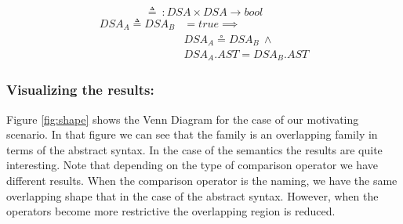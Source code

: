 \begin{itemize}
\begin{equation}
  \triangleq~: DSA \times DSA \rightarrow bool
\end{equation}
\vspace{-1mm}
\begin{equation}
\begin{split}
  DSA_{A} \triangleq DSA_{B} & = true \implies \\
   & DSA_{A} \circeq DSA_{B} ~ \wedge \\
   & DSA_{A}.AST = DSA_{B}.AST
 \end{split}
\end{equation}
\end{itemize}



\vspace{-2mm}
\subsubsection{Visualizing the results:} Figure \ref{fig:shape} shows the Venn Diagram for the case of our motivating scenario. In that figure we can see that the family is an overlapping family in terms of the abstract syntax. In the case of the semantics the results are quite interesting. Note that depending on the type of comparison operator we have different results. When the comparison operator is the naming, we have the same overlapping shape that in the case of the abstract syntax. However, when the operators become more restrictive the overlapping region is reduced. 

